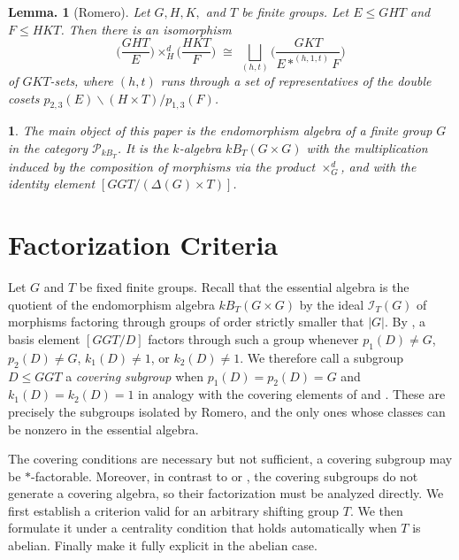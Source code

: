 \documentclass[12pt]{article}
\theoremstyle{change}
\newtheorem{lem}[theorem]{Lemma.}
\newtheorem{nothing}[theorem]{}
\renewcommand{\le}{\leqslant} %
\newcommand{\calI}{\mathcal{I}}
\newcommand{\calP}{\mathcal{P}}
\newcommand{\1}{{\bf 1}}
\begin{document}
\begin{lem}[Romero] \label{Mackey}
Let $G, H, K,$ and $T$ be finite groups. Let $E\le GHT$ and $F\le HKT$. Then there is an isomorphism
\[
\Big(\frac{GHT}{E}\Big) \times_H^d \Big(\frac{HKT}{F}\Big) \;\cong\; \bigsqcup_{(h,t)} \Big(\frac{GKT}{E*^{(h, 1, t)}F}\Big)
\]
of $GKT$-sets, where $(h,t)$ runs through a set of representatives of the double cosets
$p_{2,3}(E) \backslash (H \times T) / p_{1,3}(F)$.
\end{lem}

\begin{nothing}
The main object of this paper is the endomorphism algebra of a finite group $G$ in the category $\calP_{kB_T}$. It is the $k$-algebra $kB_T(G \times G)$ with the multiplication induced by the composition of morphisms via the product $\times_G^d$, and with the identity element $[GGT/(\Delta(G) \times T)]$.    
\end{nothing}


\section{Factorization Criteria}


Let $G$ and $T$ be fixed finite groups. Recall that the essential algebra is the quotient of the endomorphism algebra $kB_T(G\times G)$ by the ideal $\calI_T(G)$ of morphisms factoring through groups of order strictly smaller that $|G|$. By \cite[Section 3]{R1}, a basis element $[GGT/D]$ factors through such a group whenever $p_1(D)\neq G$, $p_2(D)\neq G$, $k_1(D)\neq 1$, or $k_2(D)\neq 1$. We therefore call a subgroup $D\le GGT$ a \emph{covering subgroup} when $p_1(D) = p_2(D) = G$ and $k_1(D) = k_2(D) = 1$ in analogy with the covering elements of \cite{BC} and \cite{CM}. These are precisely the subgroups isolated by Romero, and the only ones whose classes can be nonzero in the essential algebra. 

The covering conditions are necessary but not sufficient, a covering subgroup may be $\ast$-factorable. Moreover, in contrast to \cite{BC} or \cite{CM}, the covering subgroups do not generate a covering algebra, so their factorization must be analyzed directly. We first establish a criterion valid for an arbitrary shifting group $T$. We then formulate it under a centrality condition that holds automatically when $T$ is abelian. Finally make it fully explicit in the abelian case.
\end{document}
